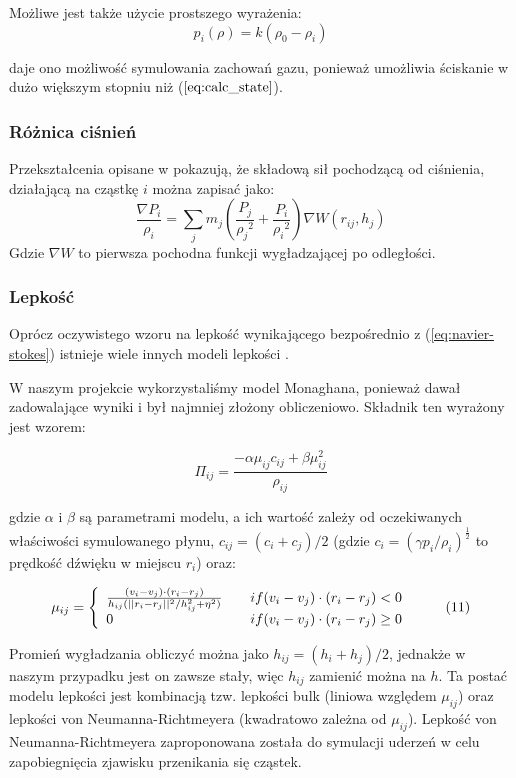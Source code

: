 \documentclass[polish, 12pt]{aghthesis}
\begin{document}
			Możliwe jest także użycie prostszego wyrażenia:	
			\[p_i(\rho) = k(\rho_0 - \rho_i) \tag{9}\]
			
			daje ono możliwość symulowania zachowań gazu, ponieważ umożliwia ściskanie w dużo większym stopniu niż ($\ref{eq:calc_state}$).
			
			\subsubsection{Różnica ciśnień}
			Przekształcenia opisane w \cite{Boryczko} pokazują, że składową sił pochodzącą od ciśnienia, działającą na cząstkę $i$ można zapisać jako: \[\frac{\nabla P_i}{\rho_i} = \sum_j m_j(\frac{P_j}{{\rho_j}^2} + \frac{P_i}{{\rho_i}^2})\nabla W(r_{ij}, h_j) \label{eq:calc_pressure} \tag{9}\] Gdzie ${\nabla}W$ to pierwsza pochodna funkcji wygładzającej po odległości.
			
			\subsubsection{Lepkość}
			Oprócz oczywistego wzoru na lepkość wynikającego bezpośrednio z (\ref{eq:navier-stokes}) istnieje wiele innych modeli lepkości \cite{Boryczko}.
						
			W naszym projekcie wykorzystaliśmy model Monaghana, ponieważ dawał zadowalające wyniki i był najmniej złożony obliczeniowo. Składnik ten wyrażony jest wzorem:
			
			\[{\Pi}_{ij} = \frac{-\alpha \mu_{ij} c_{ij} + \beta\mu_{ij}^2}{\rho_{ij}} \label{eq:viscosity_term} \tag{10}\]
	
			gdzie $\alpha$ i $\beta$ są parametrami modelu, a ich wartość zależy od oczekiwanych właściwości symulowanego płynu, $c_{ij} = (c_i + c_j) / 2$ (gdzie $c_i = (\gamma p_i / \rho_i)^\frac{1}{2}$ to prędkość dźwięku w miejscu $r_i$) oraz:
			
			\[{\mu}_{ij} = \left\{
				\begin{array}{l l}
					\frac{(v_i - v_j)\cdot(r_i - r_j)}{h_{ij}(||r_i - r_j||^2 / h_{ij}^2 + \eta^2)} & \quad if{(v_i - v_j)\cdot(r_i - r_j) < 0}  \\ 0 & \quad if{(v_i - v_j)\cdot(r_i - r_j) \geq 0} 
				\end{array} \right.\ \label{eq:mu_factor} \tag{11}\]
				
			Promień wygładzania obliczyć można jako $h_{ij} = (h_i + h_j)/2$, jednakże w naszym przypadku jest on zawsze stały, więc $h_{ij}$ zamienić można na $h$. Ta postać modelu lepkości jest kombinacją tzw. lepkości bulk (liniowa względem $\mu_{ij}$) oraz lepkości von Neumanna-Richtmeyera (kwadratowo zależna od $\mu_{ij}$). Lepkość von Neumanna-Richtmeyera zaproponowana została do symulacji uderzeń w celu zapobiegnięcia zjawisku przenikania się cząstek. 
			
\end{document}
